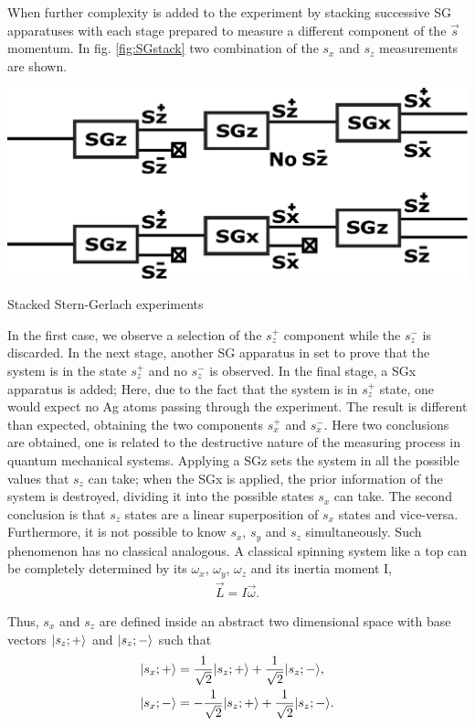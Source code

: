 \documentclass{article}
\begin{document}
When further complexity is added to the experiment by stacking successive SG apparatuses with each stage prepared to measure a different component of the $\vec{s}$ momentum. In fig. \ref{fig:SGstack} two combination of the $s_x$ and $s_z$ measurements are shown.
\begin{marginfigure}%
  \begin{centering}
  \includegraphics[width=\linewidth]{figures/SGstack.pdf}
  \caption{Stacked Stern-Gerlach experiments}
  \label{fig:SGstack}
  \end{centering}
\end{marginfigure}
In the first case, we observe a selection of the $s_z ^+$ component while the $s_z ^-$ is discarded. In the next stage, another SG apparatus in set to prove that the system is in the state $s_z ^+$ and no $s_z ^-$ is observed. In the final stage, a SGx apparatus is added; Here, due to the fact that the system is in $s_z ^+$ state, one would expect no Ag atoms passing through the experiment. The result is different than expected, obtaining the two components $s_x ^+$ and $s_x ^-$.
Here two conclusions are obtained, one is related to the destructive nature of the measuring process in quantum mechanical systems. Applying a SGz sets the system in all the possible values that $s_z$ can take; when the SGx is applied, the prior information of the system is destroyed, dividing it into the possible states $s_x$ can take. The second conclusion is that $s_z$ states are a linear superposition of $s_x$ states and vice-versa. Furthermore, it is not possible to know $s_x$, $s_y$ and $s_z$ simultaneously. Such phenomenon has no classical analogous. A classical spinning system like a top can be completely determined by its $\omega_x$, $\omega_y$, $\omega_z$ and its inertia moment I,
\begin{align}\label{eq:angularmom}
  \vec{L} = I\vec{\omega}.
\end{align}

Thus, $s_x$ and $s_z$ are defined inside an abstract two dimensional space with base vectors $\lvert s_z;+\rangle$ and $\lvert s_z;-\rangle$ such that
\begin{align}\label{eq:superposition}
  \lvert s_x;+\rangle&=\frac{1}{\sqrt{2}}\lvert s_z;+\rangle+\frac{1}{\sqrt{2}}\lvert s_z;-\rangle,\\
  \lvert s_x;-\rangle&=-\frac{1}{\sqrt{2}}\lvert s_z;+\rangle+\frac{1}{\sqrt{2}}\lvert s_z;-\rangle.
\end{align}
\end{document}
